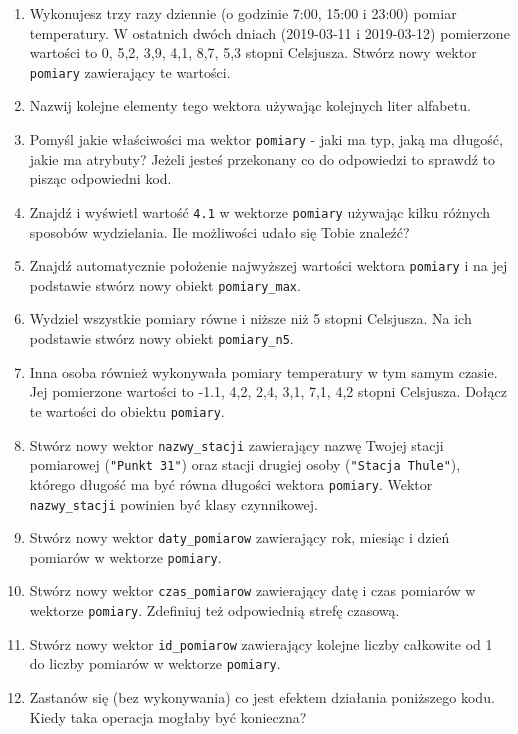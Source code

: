 \documentclass[paper=6in:9in,pagesize=pdftex,headinclude=on,footinclude=on,10pt]{scrbook}
\providecommand{\tightlist}{%
  \setlength{\itemsep}{0pt}\setlength{\parskip}{0pt}}
\begin{document}
\begin{enumerate}
\def\labelenumi{\arabic{enumi})}
\tightlist
\item
  Wykonujesz trzy razy dziennie (o godzinie 7:00, 15:00 i 23:00) pomiar temperatury.
  W ostatnich dwóch dniach (2019-03-11 i 2019-03-12) pomierzone wartości to 0, 5,2, 3,9, 4,1, 8,7, 5,3 stopni Celsjusza.
  Stwórz nowy wektor \texttt{pomiary} zawierający te wartości.
\item
  Nazwij kolejne elementy tego wektora używając kolejnych liter alfabetu.
\item
  Pomyśl jakie właściwości ma wektor \texttt{pomiary} - jaki ma typ, jaką ma długość, jakie ma atrybuty?
  Jeżeli jesteś przekonany co do odpowiedzi to sprawdź to pisząc odpowiedni kod.
\item
  Znajdź i wyświetl wartość \texttt{4.1} w wektorze \texttt{pomiary} używając kilku różnych sposobów wydzielania.
  Ile możliwości udało się Tobie znaleźć?
\item
  Znajdź automatycznie położenie najwyższej wartości wektora \texttt{pomiary} i na jej podstawie stwórz nowy obiekt \texttt{pomiary\_max}.
\item
  Wydziel wszystkie pomiary równe i niższe niż 5 stopni Celsjusza. Na ich podstawie stwórz nowy obiekt \texttt{pomiary\_n5}.
\item
  Inna osoba również wykonywała pomiary temperatury w tym samym czasie.
  Jej pomierzone wartości to -1.1, 4,2, 2,4, 3,1, 7,1, 4,2 stopni Celsjusza.
  Dołącz te wartości do obiektu \texttt{pomiary}.
\item
  Stwórz nowy wektor \texttt{nazwy\_stacji} zawierający nazwę Twojej stacji pomiarowej (\texttt{"Punkt\ 31"}) oraz stacji drugiej osoby (\texttt{"Stacja\ Thule"}), którego długość ma być równa długości wektora \texttt{pomiary}.
  Wektor \texttt{nazwy\_stacji} powinien być klasy czynnikowej.
\item
  Stwórz nowy wektor \texttt{daty\_pomiarow} zawierający rok, miesiąc i dzień pomiarów w wektorze \texttt{pomiary}.
\item
  Stwórz nowy wektor \texttt{czas\_pomiarow} zawierający datę i czas pomiarów w wektorze \texttt{pomiary}.
  Zdefiniuj też odpowiednią strefę czasową.
\item
  Stwórz nowy wektor \texttt{id\_pomiarow} zawierający kolejne liczby całkowite od 1 do liczby pomiarów w wektorze \texttt{pomiary}.
\item
  Zastanów się (bez wykonywania) co jest efektem działania poniższego kodu.
  Kiedy taka operacja mogłaby być konieczna?
\end{enumerate}
\end{document}
